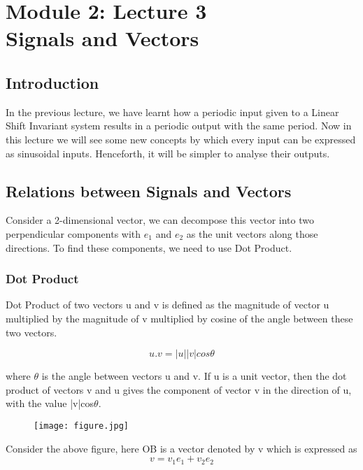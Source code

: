 \section{Module 2: Lecture 3\\Signals and Vectors}

\subsection{Introduction}
In the previous lecture, we have learnt how a periodic input given to a Linear Shift Invariant system results in a periodic output with the same period. Now in this lecture we will see some new concepts by which every input can be expressed as sinusoidal inputs. Henceforth, it will be simpler to analyse their outputs.

\subsection{Relations between Signals and Vectors}
Consider a 2-dimensional vector, we can decompose this vector into two perpendicular components with $e_1$ and $e_2$ as the unit vectors along those directions. To find these components, we need to use Dot Product.
\subsubsection{Dot Product}
	Dot Product of two vectors u and v is defined as the magnitude of vector u multiplied by the magnitude of v multiplied by cosine of the angle between these two vectors.
    
	    					\begin{equation*}u.v = |u||v|cos\theta\end{equation*}
                            
where $\theta$ is the angle between vectors u and v. If u is a unit vector, then the dot product of vectors v and u gives the component of vector v in the direction of u, with the value |v|cos$\theta$.
	\begin{figure}[ht]
\centering
\texttt{[image: figure.jpg]}
\end{figure}
    
    
    Consider the above figure, here OB is a vector denoted by v which is expressed as
    \begin{equation*}v = v_1e_1 + v_2e_2\end{equation*}
    
